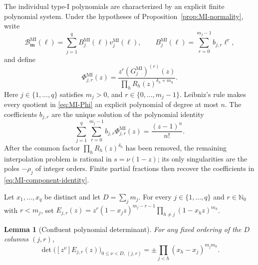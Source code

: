 \documentclass[10pt]{amsart}
\newcommand{\Nzero}{\mathbb N_0}
\newcommand{\mm}{\boldsymbol m}
\newcommand{\fall}[2]{#1^{\underline{#2}}}
\theoremstyle{plain}
\newtheorem{lemma}[theorem]{Lemma}
\theoremstyle{definition}
\theoremstyle{remark}
\begin{document}
The individual type-I polynomials are characterized by an explicit finite
polynomial system.
Under the hypotheses of Proposition~\ref{prop:MI-normality}, write
\begin{equation}
 \mathcal B_{\mm}^{\mathrm{MI}}(\ell)
 =\sum_{j=1}^qB_j^{\mathrm{MI}}(\ell)v_j^{\mathrm{MI}}(\ell),
 \qquad
 B_j^{\mathrm{MI}}(\ell)=
 \sum_{r=0}^{m_j-1}b_{j,r}\fall{\ell}{r},
 \label{eq:MI-B-components}
\end{equation}
and define
\begin{equation}
 \Phi_{j,r}^{\mathrm{MI}}(z)=
 \frac{z^r(G_j^{\mathrm{MI}})^{(r)}(z)}
 {\prod_hR_h(z)^{\delta_h+m_h}}.
 \label{eq:MI-Phi}
\end{equation}
Here \(j\in\{1,\ldots,q\}\) satisfies \(m_j>0\), and
\(r\in\{0,\ldots,m_j-1\}\).
Leibniz's rule makes every quotient in \eqref{eq:MI-Phi} an explicit
polynomial of degree at most \(n\). The coefficients \(b_{j,r}\) are the
unique solution of the polynomial identity
\begin{equation}
 \sum_{j=1}^q\sum_{r=0}^{m_j-1}
 b_{j,r}\Phi_{j,r}^{\mathrm{MI}}(z)=\frac{(z-1)^n}{n!}.
 \label{eq:MI-component-identity}
\end{equation}
After the common factor \(\prod_hR_h(z)^{\delta_h}\) has been removed,
the remaining interpolation problem is rational in
\(s=\nu(1-z)\); its only singularities are the poles \(-\rho_j\) of
integer orders. Finite partial fractions then recover the coefficients
in \eqref{eq:MI-component-identity}.

Let \(x_1,\ldots,x_q\) be distinct and let \(D=\sum_jm_j\). For every
\(j\in\{1,\ldots,q\}\) and \(r\in\Nzero\) with \(r<m_j\), set
\(E_{j,r}(z)=z^r(1-x_jz)^{m_j-r-1}
\prod_{h\ne j}(1-x_hz)^{m_h}\).

\begin{lemma}[Confluent polynomial determinant]
\label{lem:confluent-polynomial-blocks}
For any fixed ordering of the \(D\) columns \((j,r)\),
\begin{equation}
 \det\bigl([z^\nu]E_{j,r}(z)\bigr)_{
       0\le\nu<D,\,(j,r)}
 =\pm\prod_{j<h}(x_h-x_j)^{m_jm_h}.
 \label{eq:confluent-polynomial-determinant}
\end{equation}
\end{lemma}
\end{document}
